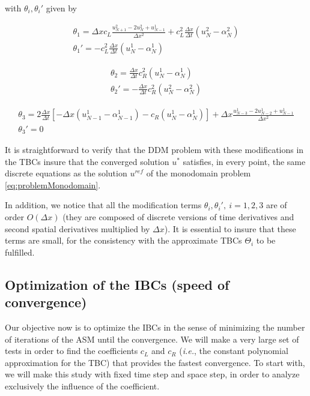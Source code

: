 \noindent with $\theta_i, \theta_i'$ given by

\begin{gather*}
    \theta_1 = \Delta x c_L \frac{u_{N+1}^2 - 2u_{N}^2 + u_{N-1}^1}{\Delta x^2} + c_L^2\frac{\Delta x}{\Delta t} \left( u_{N}^2 - \alpha_{N}^2 \right)\\
    \theta_1' = - c_L^2\frac{\Delta x}{\Delta t} \left( u_{N}^1 - \alpha_{N}^1 \right)
\end{gather*}

\begin{equation*}
\begin{gathered}
    \theta_2 = \frac{\Delta x}{\Delta t} c_R^2 (u_N^1 - \alpha_N^1) \\
    \theta_2' = -\frac{\Delta x}{\Delta t} c_R^2 (u_N^2 - \alpha_N^2)
\end{gathered}
\end{equation*}

\begin{equation*}
\begin{gathered}
    \theta_3 = 2\frac{\Delta x}{\Delta t} \left[-\Delta x(u_{N-1}^1 - \alpha_{N-1}^1) - c_R (u_N^1 - \alpha_N^1) \right] + \Delta x \frac{u_{N-3}^1 - 2u_{N-2}^1 + u_{N-1}^1}{\Delta x^2} \\
    \theta_3' = 0
\end{gathered}
\end{equation*}

\indent It is straightforward to verify that the DDM problem with these modifications in the TBCs insure that the converged solution $u^*$ satisfies, in every point, the same discrete equations as the solution $u^{ref}$ of the monodomain problem \eqref{eq:problemMonodomain}.

\indent In addition, we notice that all the modification terms $\theta_i,\theta_i', \ i = 1,2,3$ are of order $O(\Delta x)$ (they are composed of discrete versions of time derivatives and second spatial derivatives multiplied by $\Delta x$). It is essential to insure that these terms are small, for the consistency with the approximate TBCs $\Theta_i$ to be fulfilled.

\subsection{Optimization of the IBCs (speed of convergence)}

\indent Our objective now is to optimize the IBCs in the sense of minimizing the number of iterations of the ASM until the convergence. We will make a very large set of tests in order to find the coefficients $c_L$ and $c_R$ (\emph{i.e.}, the constant polynomial approximation for the TBC) that provides the fastest convergence. To start with, we will make this study with fixed time step and space step, in order to analyze exclusively the influence of the coefficient.

